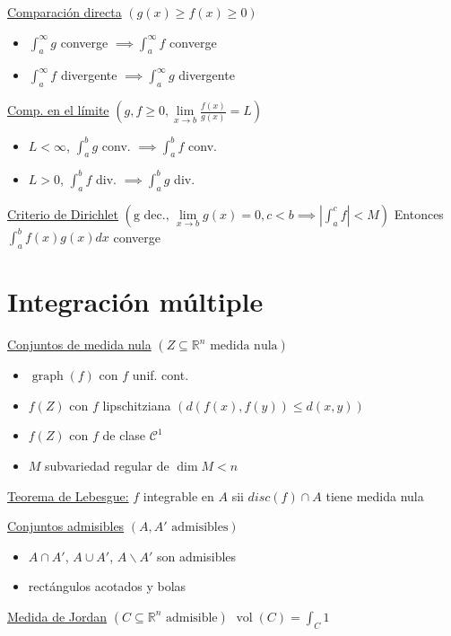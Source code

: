 \documentclass[12pt]{article}
\newcommand{\real}{\mathbb{R}}
\newcommand{\abs}[1]{\left\vert #1 \right\vert}
\DeclareMathOperator{\vol}{vol}
\DeclareMathOperator{\graph}{graph}
\begin{document}
\begin{multicols}{3}
	
	\underline{Comparación directa} $\left( g(x) \geq f(x) \geq 0 \right)$
	\begin{itemize}
		\item $\int_{a}^{\infty} g$ converge $\implies \int_{a}^{\infty} f$ converge
		\item $\int_{a}^{\infty} f$ divergente $\implies \int_{a}^{\infty} g$ divergente
	\end{itemize}
	
	\underline{Comp. en el límite} $\left( g, f \geq 0,
	\lim\limits_{x \to b} \frac{f(x)}{g(x)} = L \right)$
	\begin{itemize}
		\item $L < \infty$, $\int_{a}^{b} g$ conv. $\implies \int_{a}^{b} f$ conv.
		\item $L > 0$, $\int_{a}^{b} f$ div. $\implies \int_{a}^{b} g$ div.
	\end{itemize}
	
	\underline{Criterio de Dirichlet} $\left(\text{g dec., }\lim\limits_{x \to b} g(x) = 0,
	c < b \implies \abs{\int_{a}^{c} f} < M\right)$
	Entonces $\int_{a}^{b} f(x)g(x)dx$ converge
	
	\section{Integración múltiple}
	
	\underline{Conjuntos de medida nula} $\left( Z \subseteq \real^n \text{ medida nula} \right)$
	\begin{itemize}
		\item $\graph(f)$ con $f$ unif. cont.
		\item $f(Z)$ con $f$ lipschitziana $\left( d(f(x),f(y)) \leq d(x,y) \right)$
		\item $f(Z)$ con $f$ de clase $\mathcal{C}^1$
		\item $M$ subvariedad regular de $\dim M < n$
	\end{itemize}
	
	\underline{Teorema de Lebesgue:}
	$f$ integrable en $A$ sii $disc(f) \cap A$ tiene medida nula
	
	\underline{Conjuntos admisibles} $\left( A, A' \text{ admisibles} \right)$
	\begin{itemize}
		\item $A \cap A'$, $A \cup A'$, $A \smallsetminus A'$ son admisibles
		\item rectángulos acotados y bolas
	\end{itemize}
	
	\underline{Medida de Jordan} $\left( C \subseteq \real^n \text{ admisible}\right)$
	$\vol(C) = \int_{C}1$
	

\end{multicols}
\end{document}
